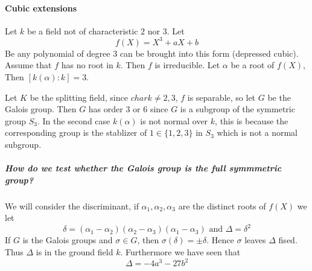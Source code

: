   \paragraph*{Cubic extensions}
  \begin{example}
    Let $k$ be a field not of characteristic $2$ nor $3$. Let \[
      f(X) = X^3 + aX +b  
    \]
    Be any polynomial of degree $3$ can be brought into this form (depressed cubic). Assume that $f$ has no root in $k$. Then $f$ is irreducible. Let $\alpha$ be a root of $f(X)$, Then $[k(\alpha)\colon k] = 3$.

    Let $K$ be the splitting field, since $char k\neq 2,3$, $f$ is separable, so let $G$ be the Galois group. Then $G$ has order $3$ or $6$ since $G$ is a subgroup of the symmetric group $S_3$. In the second case $k(\alpha)$ is not normal over $k$, this is because the corresponding group is the stablizer of $1\in \{1,2,3\}$ in $S_3$ which is not a normal subgroup.
    
    \subparagraph*{How do we test whether the Galois group is the full symmmetric group?}
    We will consider the discriminant, if $\alpha_1,\alpha_2,\alpha_3$ are the distinct roots of $f(X)$ we let\[
      \delta = (\alpha_1-\alpha_2)(\alpha_2-\alpha_3)(\alpha_1-\alpha_3) \text{ and }\Delta = \delta^2  
    \]
    If $G$ is the Galois groups and $\sigma\in G$, then $\sigma(\delta) = \pm \delta$. Hence $\sigma$ leaves $\Delta$ fised. Thus $\Delta$ is in the ground field $k$. Furthermore we have seen that \[
      \Delta = -4a^3-27b^2  
    \]
  \end{example}
\printindex

